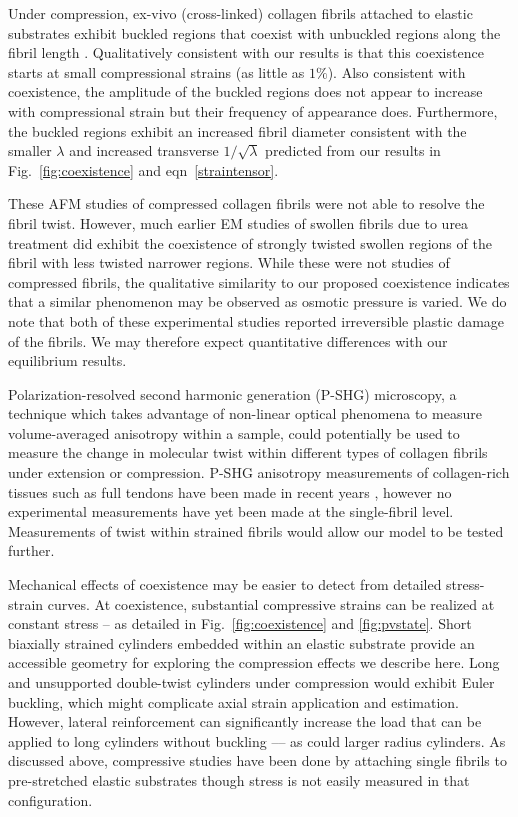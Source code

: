\documentclass[twoside,twocolumn,9pt]{article}
\begin{document}
Under compression, ex-vivo (cross-linked) collagen fibrils attached to elastic substrates exhibit buckled regions that coexist with unbuckled regions along the fibril length \cite{Peacock:2020}. Qualitatively consistent with our results is that this coexistence starts  at small compressional strains (as little as $1\%$). Also consistent with coexistence, the amplitude of the buckled regions does not appear to increase with compressional strain but their frequency of appearance does. Furthermore, the buckled regions exhibit an increased fibril diameter consistent with the smaller $\lambda$ and increased transverse $1/\sqrt{\lambda}$ predicted from our results in Fig.~\ref{fig:coexistence} and eqn~\eqref{straintensor}. 

These AFM studies of compressed collagen fibrils \cite{Peacock:2020} were not able to resolve the fibril twist. However, much earlier EM studies of swollen fibrils due to urea treatment \cite{Lillie:1977} did exhibit the coexistence of strongly twisted swollen regions of the fibril with less twisted narrower regions. While these were not studies of compressed fibrils, the qualitative similarity to our proposed coexistence indicates that a similar phenomenon may be observed as osmotic pressure is varied. We do note that both of these experimental studies \cite{Peacock:2020, Lillie:1977} reported irreversible plastic damage of the fibrils. We may therefore expect  quantitative differences with our equilibrium results. 

Polarization-resolved second harmonic generation (P-SHG) microscopy, a technique which takes advantage of non-linear optical phenomena to measure volume-averaged anisotropy within a sample, could potentially be used to measure the change in molecular twist within different types of collagen fibrils under extension or compression. P-SHG anisotropy measurements of collagen-rich tissues such as full tendons have been made in recent years \cite{Gusachenko:2012, Rouede:2020}, however no experimental measurements have yet been made at the single-fibril level. Measurements of twist within strained fibrils would allow our model to be tested further.

Mechanical effects of coexistence may be easier to detect from detailed stress-strain curves. At coexistence, substantial compressive strains can be realized at constant stress -- as detailed in Fig.~\ref{fig:coexistence} and \ref{fig:pvstate}. Short biaxially strained cylinders embedded within an elastic substrate \cite{Schmidtke:2005} provide an accessible geometry for exploring the compression effects we describe here. Long and unsupported double-twist cylinders under compression would exhibit Euler buckling, which might complicate axial strain application and estimation.  However, lateral reinforcement can significantly increase the load that can be applied to long cylinders without buckling \cite{Brangwynne:2006} –– as could larger radius cylinders. As discussed above, compressive studies have been done by attaching single fibrils to pre-stretched elastic substrates \cite{Peacock:2020} though stress is not easily measured in that configuration. 
\end{document}
